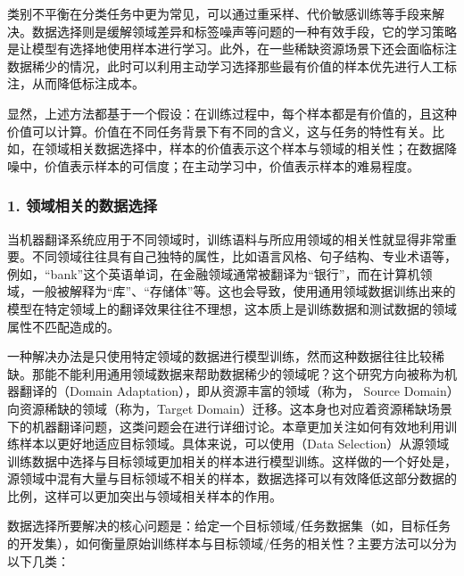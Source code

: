 \parinterval 类别不平衡在分类任务中更为常见，可以通过重采样、代价敏感训练等手段来解决。数据选择则是缓解领域差异和标签噪声等问题的一种有效手段，它的学习策略是让模型有选择地使用样本进行学习。此外，在一些稀缺资源场景下还会面临标注数据稀少的情况，此时可以利用主动学习选择那些最有价值的样本优先进行人工标注，从而降低标注成本。

\parinterval 显然，上述方法都基于一个假设：在训练过程中，每个样本都是有价值的，且这种价值可以计算。价值在不同任务背景下有不同的含义，这与任务的特性有关。比如，在领域相关数据选择中，样本的价值表示这个样本与领域的相关性；在数据降噪中，价值表示样本的可信度；在主动学习中，价值表示样本的难易程度。


\subsubsection{1. 领域相关的数据选择}

\parinterval 当机器翻译系统应用于不同领域时，训练语料与所应用领域的相关性就显得非常重要。不同领域往往具有自己独特的属性，比如语言风格、句子结构、专业术语等，例如，“bank”这个英语单词，在金融领域通常被翻译为“银行”，而在计算机领域，一般被解释为“库”、“存储体”等。这也会导致，使用通用领域数据训练出来的模型在特定领域上的翻译效果往往不理想，这本质上是训练数据和测试数据的领域属性不匹配造成的。

\parinterval 一种解决办法是只使用特定领域的数据进行模型训练，然而这种数据往往比较稀缺。那能不能利用通用领域数据来帮助数据稀少的领域呢？这个研究方向被称为机器翻译的{\small{}}（Domain Adaptation），即从资源丰富的领域（称为{\small{}}， Source Domain）向资源稀缺的领域（称为{\small{}}，Target Domain）迁移。这本身也对应着资源稀缺场景下的机器翻译问题，这类问题会在{\chaptersixteen}进行详细讨论。本章更加关注如何有效地利用训练样本以更好地适应目标领域。具体来说，可以使用{\small{}}（Data Selection）从源领域训练数据中选择与目标领域更加相关的样本进行模型训练。这样做的一个好处是，源领域中混有大量与目标领域不相关的样本，数据选择可以有效降低这部分数据的比例，这样可以更加突出与领域相关样本的作用。

\parinterval 数据选择所要解决的核心问题是：给定一个目标领域/任务数据集（如，目标任务的开发集），如何衡量原始训练样本与目标领域/任务的相关性？主要方法可以分为以下几类：


